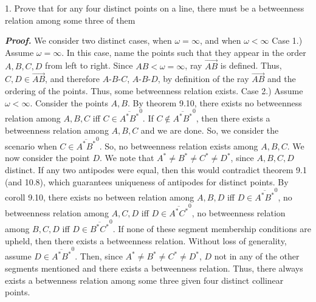 \documentclass{report}
\begin{document}
    \pagebreak 
    \bigbreak \noindent 
    \begin{mdframed}
        1. Prove that for any four distinct points on a line, there must be a betweenness relation among some three of them
    \end{mdframed}
    \bigbreak \noindent 
    \textbf{\textit{Proof.}} We consider two distinct cases, when $\omega = \infty$, and when $\omega < \infty $
    \bigbreak \noindent 
    Case 1.) Assume $\omega = \infty$. In this case, name the points such that they appear in the order $A,B,C,D$ from left to right.
    \bigbreak \noindent 
    Since $AB < \omega = \infty$, ray $\overrightarrow{AB}$ is defined. Thus, $C,D \in \overrightarrow{AB}$, and therefore $ A\text{-}B\text{-}C$, $ A\text{-}B\text{-}D$, by definition of the ray $\overrightarrow{AB}$ and the ordering of the points. Thus, some betweenness relation exists.
    \bigbreak \noindent 
    Case 2.) Assume $\omega < \infty$. Consider the points $A,B$. By theorem 9.10, there exists no betweenness relation among $A,B,C$ iff $C \in \overline{A^{*}B^{*}}^{0}$. If $C \not\in \overline{A^{*}B^{*}}^{0}$, then there exists a betweenness relation among $A,B,C$ and we are done.
    \bigbreak \noindent 
    So, we consider the scenario when $C \in \overline{A^{*}B^{*}}^{0}$. So, no betweenness relation exists among $A,B,C$. We now consider the point $D$.
    \bigbreak \noindent 
    We note that $A^{*} \ne B^{*} \ne C^{*} \ne D^{*}$, since $A,B,C,D$ distinct. If any two antipodes were equal, then this would contradict theorem 9.1 (and 10.8), which guarantees uniqueness of antipodes for distinct points.
    \bigbreak \noindent 
    By coroll 9.10, there exists no between relation among $A,B,D$ iff $ D \in  \overline{A^{*}B^{*}}^{0}$, no betweenness relation among $A,C,D$ iff $D \in \overline{A^{*}C^{*}}^{0}$, no betweenness relation among $B,C,D$ iff $D \in \overline{B^{*}C^{*}}^{0}$. 
    \bigbreak \noindent 
    If none of these segment membership conditions are upheld, then there exists a betweenness relation.
    \bigbreak \noindent 
    Without loss of generality, assume $D \in \overline{A^{*}B^{*}}^{0}$. Then, since $A^{*} \ne B^{*} \ne C^{*}\ne D^{*}$, $D$ not in any of the other segments mentioned and there exists a betweenness relation.
    \bigbreak \noindent 
    Thus, there always exists a betwenness relation among some three given four distinct collinear points.
\end{document}
